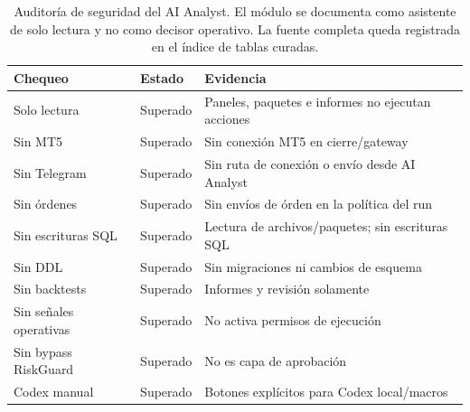 \begin{table}[H]
\centering
\scriptsize
\setlength{\tabcolsep}{4pt}
\begin{tabular}{p{}p{}p{}}
\hline
Chequeo & Estado & Evidencia \\
\hline
Solo lectura & Superado & Paneles, paquetes e informes no ejecutan acciones \\
Sin MT5 & Superado & Sin conexi\'on MT5 en cierre/gateway \\
Sin Telegram & Superado & Sin ruta de conexi\'on o env\'io desde AI Analyst \\
Sin \'ordenes & Superado & Sin env\'ios de \'orden en la pol\'itica del run \\
Sin escrituras SQL & Superado & Lectura de archivos/paquetes; sin escrituras SQL \\
Sin DDL & Superado & Sin migraciones ni cambios de esquema \\
Sin backtests & Superado & Informes y revisi\'on solamente \\
Sin se\~nales operativas & Superado & No activa permisos de ejecuci\'on \\
Sin bypass RiskGuard & Superado & No es capa de aprobaci\'on \\
Codex manual & Superado & Botones expl\'icitos para Codex local/macros \\
\hline
\end{tabular}
\caption{Auditor\'ia de seguridad del AI Analyst. El m\'odulo se documenta como asistente de solo lectura y no como decisor operativo. La fuente completa queda registrada en el \'indice de tablas curadas.}
\label{tab:ai-analyst-safety}
\end{table}
